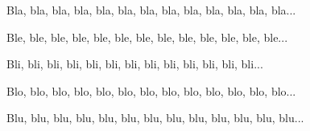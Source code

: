 Bla, bla, bla, bla, bla, bla, bla, bla, bla, bla, bla, bla, bla...

\medskip


Ble, ble, ble, ble, ble, ble, ble, ble, ble, ble, ble, ble, ble...

Bli, bli, bli, bli, bli, bli, bli, bli, bli, bli, bli, bli, bli...

\medskip


Blo, blo, blo, blo, blo, blo, blo, blo, blo, blo, blo, blo, blo...

Blu, blu, blu, blu, blu, blu, blu, blu, blu, blu, blu, blu, blu...